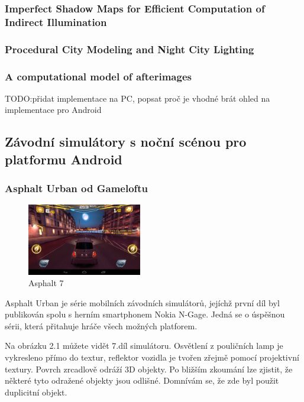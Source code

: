 \documentclass[11pt,twoside,a4paper]{book}
\begin{document}
\subsubsection{Imperfect Shadow Maps for Efficient Computation of Indirect Illumination}

\subsubsection{Procedural City Modeling and Night City Lighting}

\subsubsection{A computational model of afterimages}

TODO:přidat implementace na PC, popsat proč je vhodné brát ohled na implementace pro Android

\subsection{Závodní simulátory s noční scénou pro platformu Android}

\subsubsection{Asphalt Urban od Gameloftu}
\begin{figure}
  \includegraphics[width=50mm]{figures/games/a7.png}
  \caption{Asphalt 7}
\end{figure}
Asphalt Urban je série mobilních závodních simulátorů, jejíchž první díl byl publikován spolu s herním smartphonem Nokia N-Gage. Jedná se o úspěšnou sérii, která přitahuje hráče všech možných platforem.

Na obrázku 2.1 můžete vidět 7.díl simulátoru. Osvětlení z pouličních lamp je vykresleno přímo do textur, reflektor vozidla je tvořen zřejmě pomocí projektivní textury. Povrch zrcadlově odráží 3D objekty. Po bližším zkoumání lze zjistit, že některé tyto odražené objekty jsou odlišné. Domnívám se, že zde byl použit duplicitní objekt.
\\
\end{document}
